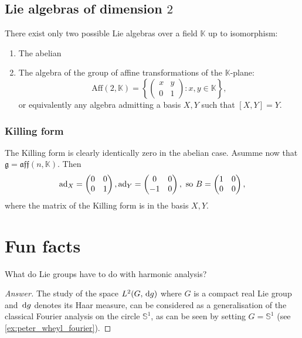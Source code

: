 \documentclass{report}
\begin{document}
\section{Lie algebras of dimension $2$}
There exist only two possible Lie algebras over a field $\mathbb K$ up to isomorphism:
\begin{enumerate}
    \item The abelian
    \item The algebra of the group of affine transformations of the $\mathbb K$-plane:
    \[
        \mathrm{Aff}(2,\mathbb K) = \left\{  
    \begin{pmatrix}
    x & y \\
    0 & 1
    \end{pmatrix}: x,y \in \mathbb K\right\},
    \]
    or equivalently any algebra admitting a basis $X, Y$ such that $[X,Y] = Y$.
\end{enumerate}
\subsection{Killing form}
The Killing form is clearly identically zero in the abelian case.
Asumme now that $\mathfrak g = \mathfrak{aff}(n, \mathbb K)$.
Then
\[
\operatorname{ad}_X = \begin{pmatrix}
    0 & 0 \\
    0 & 1
    \end{pmatrix}, 
    \operatorname{ad}_Y = \begin{pmatrix}
    0 & 0 \\
    -1 & 0
    \end{pmatrix},
    \text{ so }
    B = \begin{pmatrix}
    1 & 0 \\
    0 & 0
    \end{pmatrix},
\]
where the matrix of the Killing form is in the basis $X, Y$.

\chapter{Fun facts}

\begin{question}
    What do Lie groups have to do with harmonic analysis?
\end{question}
\begin{proof}[Answer]
    The study of the space $L^2(G, \,\mathrm{d} g)$ where $G$ is a compact real Lie group and $\,\mathrm{d} g$ denotes its Haar measure, can be considered as a generalisation of the classical Fourier analysis on the circle $\mathbb S^1$, as can be seen by setting $G = \mathbb S^1$ (see \cref{ex:peter_wheyl_fourier}).
\end{proof}


\printbibliography
\end{document}
